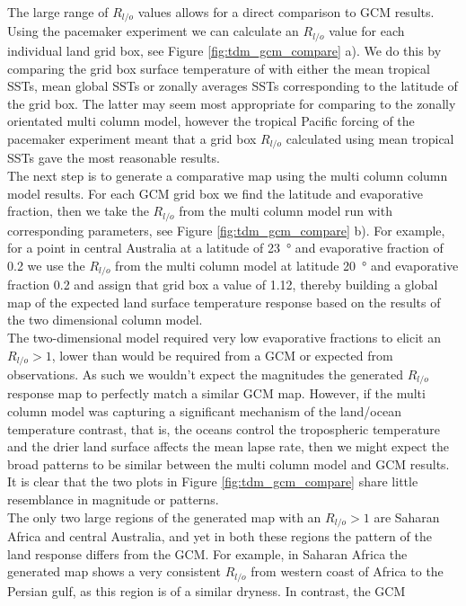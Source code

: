 The large range of $R_{l/o}$ values allows for a direct comparison to GCM 
results. Using the pacemaker experiment we can calculate an $R_{l/o}$ value for 
each individual land grid box, see Figure \ref{fig:tdm_gcm_compare} a). We do 
this by comparing the grid box surface temperature of with either the mean 
tropical SSTs, mean global SSTs or zonally averages SSTs corresponding to the 
latitude of the grid box. The latter may seem most appropriate for comparing to 
the zonally orientated multi column model, however the tropical Pacific forcing 
of the pacemaker experiment meant that a grid box $R_{l/o}$ calculated using 
mean tropical SSTs gave the most reasonable results.\\
The next step is to generate a comparative map using the multi column column model 
results. For each GCM grid box we find the latitude and evaporative fraction, 
then we take the $R_{l/o}$ from the multi column model run with corresponding parameters, 
see Figure \ref{fig:tdm_gcm_compare} b).  For example, for a point in central 
Australia at a latitude of \SI{23}{\degree} and evaporative fraction of 0.2 we 
use the $R_{l/o}$ from the multi column model at latitude \SI{20}{\degree} and evaporative 
fraction 0.2 and assign that grid box a value of 1.12, thereby building a global 
map of the expected land surface temperature response based on the results of 
the two dimensional column model.\\
The two-dimensional model required very low evaporative fractions to elicit an 
$R_{l/o}>1$, lower than would be required from a GCM or expected from 
observations. As such we wouldn't expect the magnitudes the generated $R_{l/o}$ 
response map to perfectly match a similar GCM map. However, if the multi column model was 
capturing a significant mechanism of the land/ocean temperature contrast, that 
is, the oceans control the tropospheric temperature and the drier land surface 
affects the mean lapse rate, then we might expect the broad patterns to be 
similar between the multi column model and GCM results. It is clear that the two plots in 
Figure \ref{fig:tdm_gcm_compare} share little resemblance in magnitude or 
patterns.\\
The only two large regions of the generated map with an $R_{l/o}>1$ are Saharan 
Africa and central Australia, and yet in both these regions the pattern of the 
land response differs from the GCM. For example, in Saharan Africa the generated 
map shows a very consistent $R_{l/o}$ from western coast of Africa to the 
Persian gulf, as this region is of a similar dryness. In contrast, the GCM 
